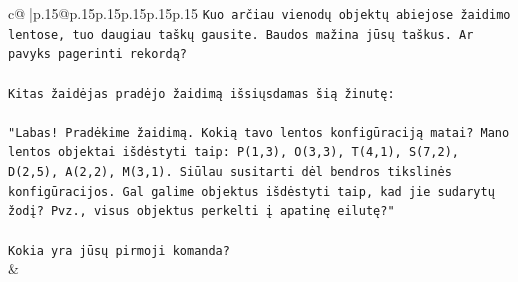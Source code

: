 \documentclass{article}
\begin{document}
{\begin{supertabular}{c@{$\;$}|p{.15\linewidth}@{}p{.15\linewidth}p{.15\linewidth}p{.15\linewidth}p{.15\linewidth}p{.15\linewidth}}
{{{\texttt{Kuo arčiau vienodų objektų abiejose žaidimo lentose, tuo daugiau taškų gausite. Baudos mažina jūsų taškus. Ar pavyks pagerinti rekordą?} \\
\\ 
\texttt{Kitas žaidėjas pradėjo žaidimą išsiųsdamas šią žinutę:} \\
\\ 
\texttt{"Labas! Pradėkime žaidimą. Kokią tavo lentos konfigūraciją matai? Mano lentos objektai išdėstyti taip: P(1,3), O(3,3), T(4,1), S(7,2), D(2,5), A(2,2), M(3,1). Siūlau susitarti dėl bendros tikslinės konfigūracijos. Gal galime objektus išdėstyti taip, kad jie sudarytų žodį? Pvz., visus objektus perkelti į apatinę eilutę?"} \\
\\ 
\texttt{Kokia yra jūsų pirmoji komanda?} \\
            }
        }
    }
    & \\ \\


\end{supertabular}}
\end{document}
